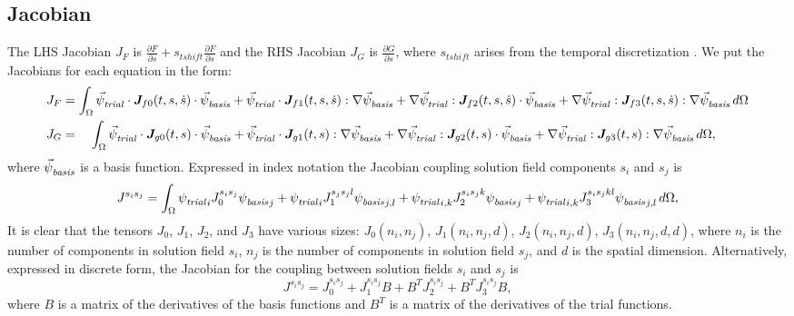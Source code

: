 \subsection{Jacobian}

The LHS Jacobian $J_F$ is $\frac{\partial F}{\partial s} +
s_\mathit{tshift} \frac{\partial F}{\partial \dot{s}}$ and the RHS
Jacobian $J_G$ is $\frac{\partial G}{\partial s}$, where
$s_\mathit{tshift}$ arises from the temporal discretization . We put
the Jacobians for each equation in the form:
\begin{align}
  \label{eqn:jacobian:form}
  J_F &= \int_\Omega \trialvec \cdot \tensor{J}_{f0}(t,s,\dot{s}) \cdot \basisvec
  + \trialvec \cdot \tensor{J}_{f1}(t,s,\dot{s}) : \nabla \basisvec
  + \nabla \trialvec : \tensor{J}_{f2}(t,s,\dot{s}) \cdot \basisvec
  + \nabla \trialvec : \tensor{J}_{f3}(t,s,\dot{s}) : \nabla \basisvec \, d\Omega \\
%
  J_G &= \quad \int_\Omega \trialvec \cdot \tensor{J}_{g0}(t,s) \cdot \basisvec
  + \trialvec \cdot \tensor{J}_{g1}(t,s) : \nabla \basisvec
  + \nabla \trialvec : \tensor{J}_{g2}(t,s) \cdot \basisvec
  + \nabla \trialvec : \tensor{J}_{g3}(t,s) : \nabla \basisvec \, d\Omega,
\end{align}
where ${\vec{\psi}_\mathit{basis}^{}}$ is a basis function.  Expressed in index notation
the Jacobian coupling solution field components $s_i$ and $s_j$ is
\begin{equation}
\label{eqn:jacobian:index:form}
J^{s_is_j} = \int_\Omega {\psi_\mathit{trial}^{}}_i J_0^{s_is_j} {\psi_\mathit{basis}^{}}_j + {\psi_\mathit{trial}^{}}_i 
J_1^{s_js_jl} 
{\psi_\mathit{basis}^{}}_{j,l} + {\psi_\mathit{trial}^{}}_{i,k} J_2^{s_is_jk} {\psi_\mathit{basis}^{}}_j + {\psi_\mathit{trial}^{}}_{i,k} 
J_3^{s_is_jkl} 
{\psi_\mathit{basis}^{}}_{j,l} \, d\Omega, 
\end{equation}
It is clear that the tensors $J_0$, $J_1$, $J_2$, and $J_3$ have
various sizes: $J_0(n_i,n_j)$, $J_1(n_i,n_j,d)$, $J_2(n_i,n_j,d)$,
$J_3(n_i,n_j,d,d)$, where $n_i$ is the number of components in
solution field $s_i$, $n_j$ is the number of components in solution
field $s_j$, and $d$ is the spatial dimension.  Alternatively,
expressed in discrete form, the Jacobian for the coupling between
solution fields $s_i$ and $s_j$ is
\begin{equation}
  \label{eqn:jacobian:discrete:form}
  J^{s_is_j} = J_{0}^{s_is_j} + J_{1}^{s_is_j} B + B^T J_{2}^{s_is_j} + B^T J_{3}^{s_is_j} B,
\end{equation}
where $B$ is a matrix of the derivatives of the basis functions and $B^T$
is a matrix of the derivatives of the trial functions. 


